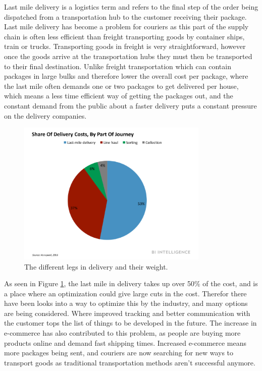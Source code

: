 \documentclass[12pt]{report}
\begin{document}
Last mile delivery is a logistics term and refers to the final step of the order being dispatched from a transportation hub to the customer receiving their package. 
Last mile delivery has become a problem for couriers as this part of the supply chain is often less efficient than freight transporting goods by container ships, train or trucks. Transporting goods in freight is very straightforward, however once the goods arrive at the transportation hubs they must then be transported to their final destination. Unlike freight transportation which can contain packages in large bulks and therefore lower the overall cost per package, where the last mile often demands one or two packages to get delivered per house, which means a less time efficient way of getting the packages out, and the constant demand from the public about a faster delivery puts a constant pressure on the delivery companies. 
\begin{figure}[H]
  \centering
  \includegraphics[width=345]{pics/lastmile.png}
  \caption{The different legs in delivery and their weight\cite{lastmile2}.}
  \label{fig: LastMile}
\end{figure}
As seen in Figure \ref{fig: LastMile}, the last mile in delivery takes up over 50\% of the cost, and is a place where an optimization could give large cuts in the cost. 
Therefor there have been looks into a way to optimize this by the industry, and many options are being considered.\cite{lastmile}
Where improved tracking and better communication with the customer tops the list of things to be developed in the future.
The increase in e-commerce has also contributed to this problem, as people are buying more products online and demand fast shipping times. Increased e-commerce means more packages being sent, and couriers are now searching for new ways to transport goods as traditional transportation methods aren't successful anymore\cite{lastmile}. 
\end{document}
